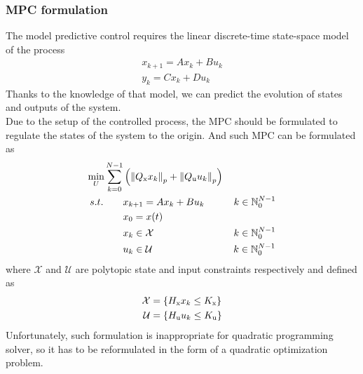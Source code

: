 \subsubsection{MPC formulation}
The model predictive control requires the linear discrete-time state-space model of the process
\begin{subequations}\label{linmodel}
	\begin{align}	
	x_{k+1} = Ax_k + Bu_k\\
	y_k = Cx_k + Du_k
	\end{align}
\end{subequations}
Thanks to the knowledge of that model, we can predict the evolution of states and outputs of the system.\\
Due to the setup of the controlled process, the MPC should be formulated to regulate the states of the system to the origin. And such MPC can be formulated as
\begin{subequations}\label{mpcgeneral}
	\begin{align}
		\min_{U} \sum_{k=0}^{N-1}& \left( \left\| Q _{\text{x}}x_{k}\right\|_p+\left\|Q _{\text{u}}u_{k}\right\|_p \right)\\
	    \label{eq217b}s.t.\qquad&x_{k+1} = Ax_{k} + Bu_{k}\qquad\quad  k \in \mathbb{N}_0^{N-1}\\
		&x_0 = x(t)\\
		\label{cst_x}&x_{k}\in\mathcal{X}\qquad\qquad\qquad\qquad\,  k \in \mathbb{N}_0^{N-1}\\
		\label{cst_u}&u_{k}\in\mathcal{U}\qquad\qquad\qquad\qquad\;   k \in \mathbb{N}_0^{N-1}
	\end{align}
\end{subequations}
where $\mathcal{X}$ and $\mathcal{U}$ are polytopic state and input constraints respectively and defined as
\begin{subequations}
	\begin{align}
	\mathcal{X} &= \{H _{\text{x}}x_k\leq K _{\text{x}}\}\\
	\mathcal{U} &= \{H _{\text{u}}u_k\leq K _{\text{u}}\}
	\end{align}
\end{subequations}
Unfortunately, such formulation is inappropriate for quadratic programming solver, so it has to be reformulated in the form of a quadratic optimization problem.
